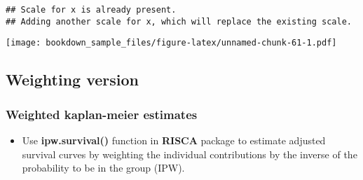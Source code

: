 \documentclass[
]{book}
\providecommand{\tightlist}{%
  \setlength{\itemsep}{0pt}\setlength{\parskip}{0pt}}
\begin{document}
\begin{verbatim}
## Scale for x is already present.
## Adding another scale for x, which will replace the existing scale.
\end{verbatim}

\texttt{[image: bookdown\_sample\_files/figure-latex/unnamed-chunk-61-1.pdf]}

\hypertarget{weighting-version-1}{%
\subsection{Weighting version}\label{weighting-version-1}}

\hypertarget{weighted-kaplan-meier-estimates}{%
\subsubsection{Weighted kaplan-meier estimates}\label{weighted-kaplan-meier-estimates}}

\begin{itemize}
\tightlist
\item
  Use \textbf{ipw.survival()} function in \textbf{RISCA} package to estimate adjusted survival curves by weighting the individual contributions by the inverse of the probability to be in the group (IPW).
\end{itemize}
\end{document}
